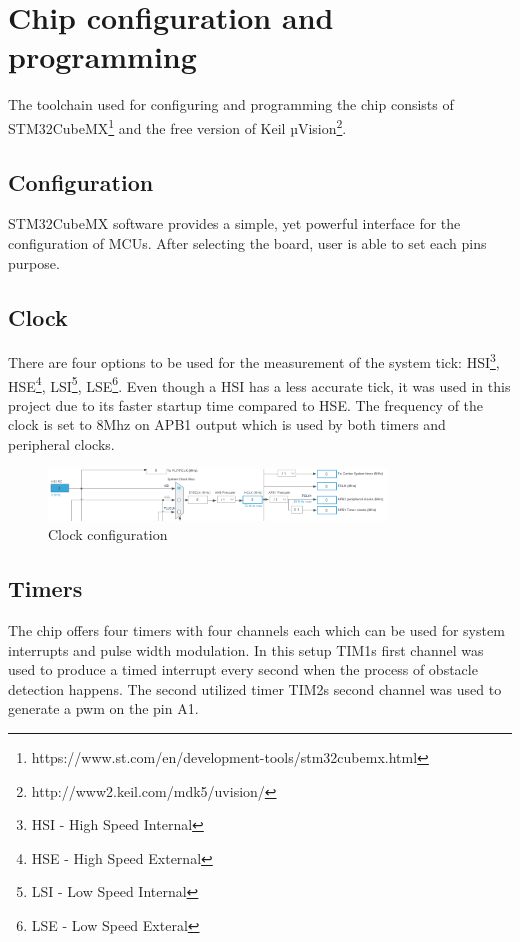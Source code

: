 \section{Chip configuration and programming}

The toolchain used for configuring and programming the chip consists of STM32CubeMX\footnote{https://www.st.com/en/development-tools/stm32cubemx.html} and the free version of Keil µVision\footnote{http://www2.keil.com/mdk5/uvision/}.

\subsection{Configuration}

STM32CubeMX software provides a simple, yet powerful interface for the configuration of MCUs. After selecting the board, user is able to set each pins purpose.

\subsection{Clock}
There are four options to be used for the measurement of the system tick: HSI\footnote{HSI - High Speed Internal}, HSE\footnote{HSE - High Speed External}, LSI\footnote{LSI - Low Speed Internal}, LSE\footnote{LSE - Low Speed Exteral}. Even though a HSI has a less accurate tick, it was used in this project due to its faster startup time compared to HSE. The frequency of the clock is set to 8Mhz on APB1 output which is used by both timers and peripheral clocks. 


\begin{figure}[htbp]
    \centerline{\includegraphics[width=9cm]{Images/Clock.png}}
    \caption{Clock configuration}
    \label{fig7}
\end{figure}

\subsection{Timers}
The chip offers four timers with four channels each which can be used for system interrupts and pulse width modulation. 
In this setup TIM1s first channel was used to produce a timed interrupt every second when the process of obstacle detection happens. 
The second utilized timer TIM2s second channel was used to generate a pwm on the pin A1.

